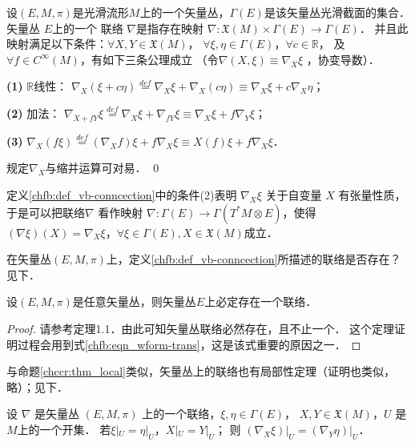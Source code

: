 \begin{definition}\label{chfb:def_vb-conncection}
    设$(E,M,\pi)$是光滑流形$M$上的一个矢量丛，$\Gamma(E)$是该矢量丛光滑截面的集合．
    矢量丛 $E$上的一个 {\heiti 联络} $\nabla$是指存在映射
    $\nabla: \mathfrak{X}(M) \times \Gamma(E) \rightarrow \Gamma(E)$．
    并且此映射满足以下条件：$\forall X, Y \in \mathfrak{X}(M)$，
    $\forall \xi, \eta \in \Gamma(E)$，$\forall c \in \mathbb{R}$，
    及 $\forall f \in C^{\infty}(M)$，有如下三条公理成立
    （令$\nabla(X, \xi)\equiv \nabla_X \xi$ ，{\heiti 协变导数}）．
    
    {\bfseries (1)} $\mathbb{R}$线性： $\nabla_X(\xi+c \eta) \overset{def}{=}
     \nabla_X \xi+\nabla_X (c\eta) \equiv  \nabla_X \xi+c \nabla_X \eta$；
    
    {\bfseries (2)} 加法： $\nabla_{X+f Y} \xi \overset{def}{=} 
    \nabla_X \xi+ \nabla_{fY} \xi \equiv \nabla_X \xi+f \nabla_Y \xi$；
    
    {\bfseries (3)} $\nabla_X(f \xi) \overset{def}{=} (\nabla_X f) \xi+f \nabla_X \xi
     \equiv X(f) \xi+f \nabla_X \xi$．
    
   
    规定$\nabla_X$与缩并运算可对易． \qed
\end{definition}


定义\ref{chfb:def_vb-conncection}中的条件(2)表明 $\nabla_X \xi$ 关于自变量 $X$ 有张量性质，
于是可以把联络$\nabla$ 看作映射 $\nabla: \Gamma(E) \rightarrow \Gamma (T^* M \otimes E )$，使得
$(\nabla \xi)(X)=\nabla_X \xi$，$ \forall \xi \in \Gamma(E), X \in \mathfrak{X}(M) $成立．


在矢量丛$(E,M,\pi)$上，定义\ref{chfb:def_vb-conncection}所描述的联络是否存在？见下．

\begin{theorem}\label{chfb:thm_existence}
    设$(E,M,\pi)$是任意矢量丛，则矢量丛$E$上必定存在一个联络．
\end{theorem}
\begin{proof}
    请参考\parencite[p.104]{cc2001-zh}定理1.1．由此可知矢量丛联络必然存在，且不止一个．
    这个定理证明过程会用到式\eqref{chfb:eqn_wform-trans}，这是该式重要的原因之一．
\end{proof}

与命题\ref{chccr:thm_local}类似，矢量丛上的联络也有局部性定理（证明也类似，略）；见下．
\begin{proposition}
    设 $\nabla$ 是矢量丛 $(E,M,\pi)$ 上的一个联络，$\xi, \eta \in \Gamma(E)$，
    $ X, Y \in \mathfrak{X}(M)$，$U$ 是 $M$上的一个开集． 
    若$ \xi|_U = \eta|_U$，$ X|_U = Y|_U $；
    则 $\left.\left(\nabla_X \xi\right)\right|_U=\left.\left(\nabla_Y \eta\right)\right|_U$．
\end{proposition}

